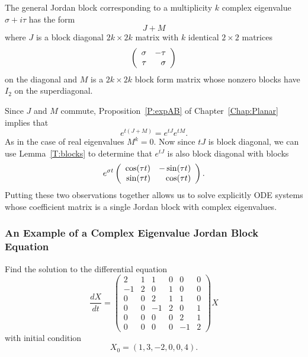 \documentclass{ximera}
\begin{document}
The general Jordan block corresponding to a multiplicity $k$ complex
eigenvalue $\sigma+i\tau$ has the form 
\begin{equation} \label{e:JM}
J + M
\end{equation}
where $J$ is a block diagonal 
$2k\times 2k$ matrix with $k$ identical $2\times 2$ matrices 
\[
\left(\begin{array}{rr} \sigma & -\tau\\ \tau &\sigma\end{array}\right)
\]
on the diagonal and $M$ is a $2k\times 2k$ block form matrix 
whose nonzero blocks have $I_2$ on the superdiagonal.

Since $J$ and $M$ commute, Proposition~\ref{P:expAB} of 
Chapter~\ref{Chap:Planar} implies that
\[
e^{t(J+M)} = e^{tJ} e^{tM}.
\]
As in the case of real eigenvalues $M^k=0$.  Now since $tJ$ is block 
diagonal, we can use Lemma~\ref{T:blocks} to determine that $e^{tJ}$ 
is also block diagonal with blocks 
\[
e^{\sigma t}\left(\begin{array}{rr} \cos(\tau t) & -\sin(\tau t)\\ \sin(\tau t) &\cos(\tau t)\end{array}\right).
\]
Putting these two observations together allows us to solve explicitly 
ODE systems whose coefficient matrix
is a single Jordan block with complex eigenvalues.



\subsubsection*{An Example of a Complex Eigenvalue Jordan Block Equation}

Find the solution to the differential equation 
\[
\frac{dX}{dt} = \left(\begin{array}{rr|rr|rr} 
 2 & 1 & 1 & 0 & 0 & 0\\
-1 & 2 & 0 & 1 & 0 & 0 \\  
 \hline
 0 & 0 & 2 & 1 & 1 & 0 \\
 0 & 0 &-1 & 2 & 0 & 1 \\
\hline
 0 & 0 & 0 & 0 & 2 & 1\\
 0 & 0 & 0 & 0 &-1 & 2  \end{array}\right) X
\]
with initial condition
\[
X_0 = (1, 3, -2, 0, 0, 4).
\]
\end{document}
